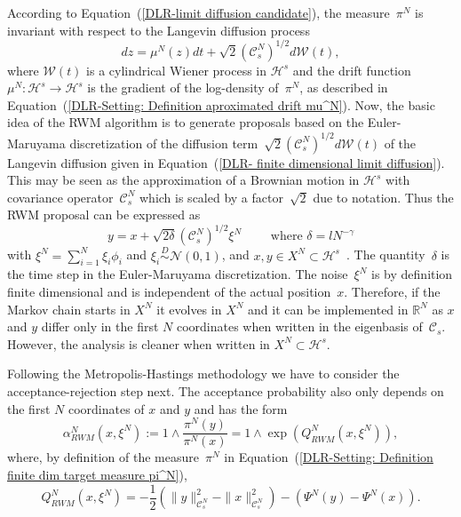 According to Equation~(\ref{DLR-limit diffusion candidate}), the measure~$\pi^N$ is invariant with respect to the Langevin diffusion process
\begin{equation}
 \label{DLR- finite dimensional limit diffusion}
 dz = \mu^N (z) dt + \sqrt{2} (\mathcal{C}_s^N)^{1/2} d\mathcal{W}(t),
\end{equation}
where $\mathcal{W}(t)$ is a cylindrical Wiener process in $\mathcal{H}^s$ and the drift function ~$\mu^N : \mathcal{H}^s \to \mathcal{H}^s$ is the gradient of the log-density of~$\pi^N$, as described in Equation~(\ref{DLR-Setting: Definition aproximated drift mu^N}). Now, the basic idea of the RWM algorithm is to generate proposals based on the Euler-Maruyama discretization of the diffusion term~$ \sqrt{2} (\mathcal{C}_s^N)^{1/2} d\mathcal{W}(t) $ of the Langevin diffusion given in Equation~(\ref{DLR- finite dimensional limit diffusion}). This may be seen as the approximation of a Brownian motion in $\mathcal{H}^s$ with covariance operator~$\mathcal{C}_s^N$ which is scaled by a factor~$\sqrt{2}$ due to notation. Thus the RWM proposal can be expressed as
\begin{equation}
\label{DLR-Setting: Definiton RWM-proposal}
 y = x + \sqrt{2 \delta} (\mathcal{C}_s^{N})^{1/2} \xi^{N} \qquad \text{ where } \delta = l N^{-\gamma}
\end{equation}
with  $\xi^{N} = \sum_{i=1}^{N} \xi_i \phi_i$ and $\xi_i \stackrel{D}{\sim} \mathcal{N}(0,1)$, and $x, y \in X^{N} \subset \mathcal{H}^s$~\autocite[Equation (1.11)]{Mattingly2010}. The quantity~$\delta$ is the time step in the Euler-Maruyama discretization. The noise~$\xi^N$ is by definition finite dimensional and is independent of the actual position~$x$. Therefore, if the Markov chain starts in $X^N$ it evolves in $X^N$ and it can be implemented in $\mathbb{R}^N$ as $x$ and $ y$ differ only in the first $N$ coordinates when written in the eigenbasis of~$\mathcal{C}_s$. However, the analysis is cleaner when written in $X^N \subset \mathcal{H}^s$. 

Following the Metropolis-Hastings methodology we have to consider the acceptance-rejection step next. The acceptance probability also only depends on the first $N$ coordinates of $x$ and $y$ and has the form
\begin{equation}
 \label{DLR-Setting: Definition acceptance proba RWM}
 \alpha^N_{RWM}(x, \xi^N) := 1 \wedge \frac{\pi^N(y)}{\pi^N(x)} = 1 \wedge \exp (Q^N_{RWM}(x, \xi^N) ),
\end{equation}
where, by definition of the measure~$\pi^N$ in Equation~(\ref{DLR-Setting: Definition finite dim target measure pi^N}),
\begin{equation}
 Q_{RWM}^{N}(x, \xi^{N}) = - \frac{1}{2} \left(\| y \|_{\mathcal{C}_s^N}^2 - \| x \|_{\mathcal{C}_s^N}^2\right) - \left( \Psi^N(y) - \Psi^N(x) \right).
\end{equation}

